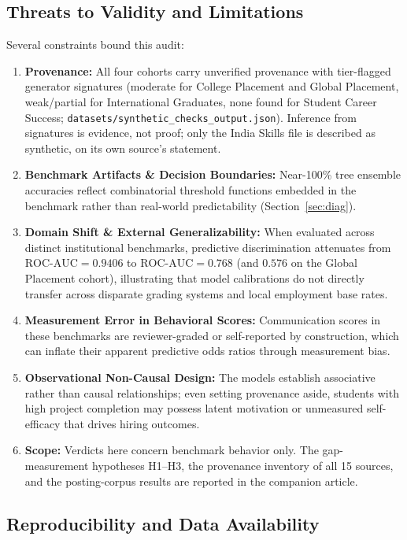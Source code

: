 \documentclass[journal]{IEEEtran}
\begin{document}
\subsection{Threats to Validity and Limitations}
\label{sec:limitations_p}

Several constraints bound this audit:
\begin{enumerate}
    \item \textbf{Provenance:} All four cohorts carry unverified provenance with tier-flagged generator signatures (moderate for College Placement and Global Placement, weak/partial for International Graduates, none found for Student Career Success; \texttt{datasets/synthetic\_checks\_output.json}). Inference from signatures is evidence, not proof; only the India Skills file is described as synthetic, on its own source's statement.
    \item \textbf{Benchmark Artifacts \& Decision Boundaries:} Near-100\% tree ensemble accuracies reflect combinatorial threshold functions embedded in the benchmark rather than real-world predictability (Section~\ref{sec:diag}).
    \item \textbf{Domain Shift \& External Generalizability:} When evaluated across distinct institutional benchmarks, predictive discrimination attenuates from $\text{ROC-AUC} = 0.9406$ to $\text{ROC-AUC} = 0.768$ (and $0.576$ on the Global Placement cohort), illustrating that model calibrations do not directly transfer across disparate grading systems and local employment base rates.
    \item \textbf{Measurement Error in Behavioral Scores:} Communication scores in these benchmarks are reviewer-graded or self-reported by construction, which can inflate their apparent predictive odds ratios through measurement bias.
    \item \textbf{Observational Non-Causal Design:} The models establish associative rather than causal relationships; even setting provenance aside, students with high project completion may possess latent motivation or unmeasured self-efficacy that drives hiring outcomes.
    \item \textbf{Scope:} Verdicts here concern benchmark behavior only. The gap-measurement hypotheses H1--H3, the provenance inventory of all 15 sources, and the posting-corpus results are reported in the companion article.
\end{enumerate}

\subsection{Reproducibility and Data Availability}
\label{sec:reproducibility_p}
\end{document}
